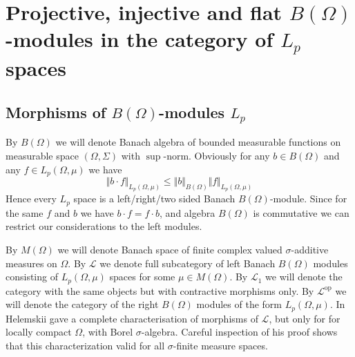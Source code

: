 \documentclass[12pt]{article}
\begin{document}

\section{
  Projective, injective and flat
  \texorpdfstring{$B(\Omega)$}{B (Omega)}-modules in
  the category of \texorpdfstring{$L_p$}{Lp} spaces
 }


\subsection{
    Morphisms of \texorpdfstring{$B(\Omega)$}{B (Omega)}-modules
    \texorpdfstring{$L_p$}{Lp}
}

By $B(\Omega)$ we will denote Banach algebra of bounded measurable functions
on measurable space $(\Omega,\Sigma)$ with $\sup$-norm. Obviously for
any $b\in B(\Omega)$ and any $f\in L_p(\Omega,\mu)$ we have
$$
    \Vert b\cdot f\Vert_{L_p(\Omega,\mu)} \leq\Vert b\Vert_{B(\Omega)}\Vert
    f\Vert_{L_p(\Omega,\mu)}
$$
Hence every $L_p$ space is a left/right/two sided Banach $B(\Omega)$-module.
Since for the same $f$ and $b$ we have $b\cdot f=f\cdot b$, and
algebra $B(\Omega)$ is commutative we can restrict our considerations
to the left modules.

By $M(\Omega)$ we will denote Banach space of finite complex valued
$\sigma$-additive measures on $\Omega$. By $\mathscr{L}$ we denote full
subcategory of left Banach $B(\Omega)$ modules consisting of $L_p(\Omega,\mu)$
spaces for some $\mu\in M(\Omega)$. By $\mathscr{L}_1$ we will denote the
category with the same objects but with contractive morphisms only.
By $\mathscr{L}^{\operatorname{op}}$ we will denote the category of the right
$B(\Omega)$ modules of the form $L_p(\Omega,\mu)$.
In~\cite{HelTensProdAndMultModLp} Helemskii gave a complete characterisation of
morphisms of $\mathscr{L}$, but only for for locally compact $\Omega$, with
Borel $\sigma$-algebra. Careful inspection of his proof shows that this
characterization valid for all $\sigma$-finite measure spaces.
\end{document}
